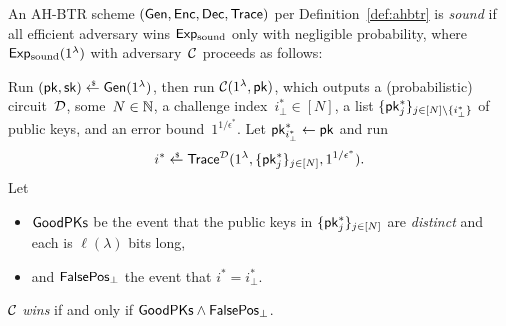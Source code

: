 \begin{definition}[soundness]\label{def:soundness}
An AH-BTR scheme $(\Gen,\Enc,\Dec,\Trace)$ per Definition~\ref{def:ahbtr} is \emph{sound}
if all efficient adversary wins $\ExpSound$ only with negligible probability,
where $\ExpSound(1^\lambda)$ with adversary~${\mathcal{C}}$ proceeds as follows:
\begin{security}
Run ${(\pk,\sk)\draws\Gen(1^\lambda)}$,
then run $\scriptC(1^\lambda,\pk)$, which outputs
a (probabilistic) circuit~${\mathcal{D}}$,
some~${N\in{\mathbb{N}}}$,
a challenge index~${i_\bot^\ast\in[N]}$,
a list $\{\pk^\ast_j\}_{j\in[N]\setminus\{i_\bot^\ast\}}$ of public keys, and
an error bound~$1^{1/\epsilon^\ast}$.
Let ${\pk^\ast_{i_\bot^\ast}\gets\pk}$ and run
\begin{align*}
i^\ast\draws\Trace^\scriptD(1^\lambda,\{\pk^\ast_j\}_{j\in[N]},1^{1/\epsilon^\ast}).
\end{align*}
Let
\begin{itemize}
\item $\GoodPKs$ be the event that the public keys in $\{\pk^\ast_j\}_{j\in[N]}$ are \emph{distinct} and each is $\ell(\lambda)$ bits long,
\item and $\FalsePos_\bot$ the event that ${i^\ast=i_\bot^\ast}$.
\end{itemize}
${\mathcal{C}}$ \emph{wins} if and only if ${\GoodPKs\wedge\FalsePos_\bot}$.
\end{security}
\end{definition}
